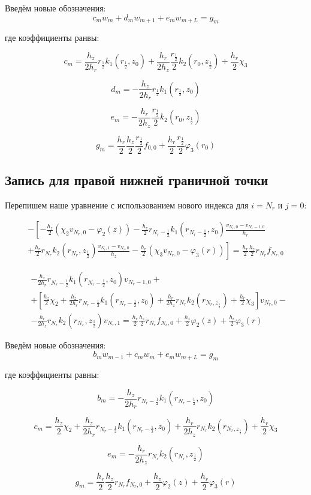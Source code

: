 Введём новые обозначения:
\[
  c_m w_m + d_m w_{m + 1} + e_m w_{m + L} = g_m
\]

где коэффициенты ранвы:

\[
  c_m = \frac{h_z}{2 h_r} r_{\frac{1}{2}} k_1(r_{\frac{1}{2}}, z_0) + \frac{h_r}{2 h_z} \frac{r_{\frac{1}{2}}}{2} k_2(r_0, z_{\frac{1}{2}}) + \frac{h_r}{2} \chi_3
\]

\[
  d_m = - \frac{h_z}{2 h_r} r_\frac{1}{2} k_1(r_\frac{1}{2}, z_0)
\]

\[
  e_m = - \frac{h_r}{2 h_z} \frac{r_{\frac{1}{2}}}{2} k_2(r_0, z_{\frac{1}{2}})
\]

\[
  g_m = \frac{h_r}{2} \frac{h_z}{2} \frac{r_{\frac{1}{2}}}{2} f_{0, 0} + \frac{h_r}{2} \frac{r_{\frac{1}{2}}}{2} \varphi_3(r_0)
\]

\subsection{Запись для правой нижней граничной точки}

Перепишем наше уравнение с использованием нового индекса для $i = N_r $ и $ j = 0 $:

\begin{align*}
  - \left [ 
  -\frac{h_z}{2} (\chi_2 v_{N_r, 0} - \varphi_2(z) )
  - \frac{h_z}{2} r_{N_r-\frac{1}{2}} k_1(r_{N_r-\frac{1}{2}}, z_0) \frac{v_{N_r, 0} - v_{N_r - 1, 0}}{h_{r}}
  \right . \\
  \left .
  + \frac{h_r}{2} r_{N_r} k_2(r_{N_r}, z_{\frac{1}{2}}) \frac{v_{N_r, 1} - v_{N_r, 0}}{h_{z}}
  - \frac{h_r}{2}(\chi_3 v_{N_r, 0} - \varphi_3(r))
  \right ]  = \frac{h_r}{2} \frac{h_z}{2} r_{N_r} f_{N_r, 0}
\end{align*}

\begin{align*}
  & - \frac{h_z}{2 h_r} r_{N_r - \frac{1}{2}} k_1 (r_{N_r - \frac{1}{2}}, z_0) v_{N_r - 1, 0} +\\
  & + \left[
    \frac{h_z}{2} \chi_2 + \frac{h_z}{2 h_r} r_{N_r - \frac{1}{2}} k_1 (r_{N_r - \frac{1}{2}}, z_0) 
    + \frac{h_r}{2 h_z} r_{N_r} k_2(r_{N_r, z_{\frac{1}{2}}}) + \frac{h_r}{2} \chi_3
  \right] v_{N_r, 0} - \\
  & - \frac{h_r}{2 h_z} r_{N_r} k_2(r_{N_r}, z_{\frac{1}{2}}) v_{N_r, 1}
  = \frac{h_r}{2} \frac{h_z}{2} r_{N_r} f_{N_r, 0} + \frac{h_z}{2} \varphi_2(z) + \frac{h_r}{2} \varphi_3(r)
\end{align*}

Введём новые обозначения:
\[
  b_m w_{m - 1} + c_m w_m + e_m w_{m + L} = g_m
\]

где коэффициенты равны:

\[
  b_m = - \frac{h_z}{2 h_r} r_{N_r - \frac{1}{2}} k_1 (r_{N_r - \frac{1}{2}}, z_0)
\]

\[
  c_m = \frac{h_z}{2} \chi_2 + \frac{h_z}{2 h_r} r_{N_r - \frac{1}{2}} k_1 (r_{N_r - \frac{1}{2}}, z_0) 
  + \frac{h_r}{2 h_z} r_{N_r} k_2(r_{N_r, z_{\frac{1}{2}}}) + \frac{h_r}{2} \chi_3
\]

\[
  e_m = - \frac{h_r}{2 h_z} r_{N_r} k_2(r_{N_r}, z_{\frac{1}{2}}) 
\]

\[
  g_m = \frac{h_r}{2} \frac{h_z}{2} r_{N_r} f_{N_r, 0} + \frac{h_z}{2} \varphi_2(z) + \frac{h_r}{2} \varphi_3(r)
\]